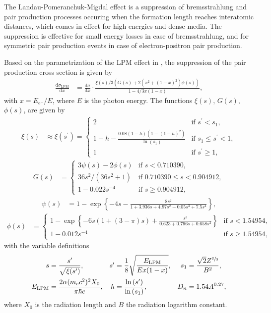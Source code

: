 The Landau-Pomeranchuk-Migdal effect is a suppression of bremsstrahlung and pair production processes occuring when the formation length reaches interatomic distances, which comes in effect for high energies and dense media.
The suppression is effective for small energy losses in case of bremsstrahlung, and for symmetric pair production events in case of electron-positron pair production.

Based on the parametrization of the LPM effect in \cite{RevModPhys.71.1501}, the suppression of the pair production cross section is given by
%
\begin{align}
	\label{eqn:lpm_photopair}
	\frac{\mathrm{d}\sigma_\text{LPM}}{\mathrm{d}x} &= \frac{\mathrm{d}\sigma}{\mathrm{d}x} \cdot \frac{\xi(s) / 3 \left(G(s) + 2 \left( x^2 + (1 - x)^2 \right) \phi(s) \right)}{1 - 4 / 3 x (1 - x)},
\end{align}
%
with $x = E_{e^{-}} / E$, where $E$ is the photon energy.
The functions $\xi(s)$, $G(s)$, $\phi(s)$, are given by \cite{PhysRevD.25.1291, PhysRev.103.1811}
%
\begin{align}
	\xi(s) &\approx \xi(s^\prime) =
	\begin{cases}
		2 & \text{if $s^\prime < s_1$}, \\
		1 + h - \frac{0.08 (1 - h) (1 - (1-h)^2)}{\ln{(s_1)}} & \text{if $s_1 \leq s^\prime < 1$}, \\
		1 & \text{if $s^\prime \geq 1$},
	\end{cases}
\end{align}
%
\begin{align}
	G(s) &=
	\begin{cases}
		3\psi(s) - 2\phi(s) & \text{if $s < \num{0.710390}$}, \\
		36s^2 / \left(36s^2 + 1 \right) & \text{if $\num{0.710390} \leq s < \num{0.904912}$}, \\
		1 - 0.022s^{-4} & \text{if $s \geq \num{0.904912}$},
	\end{cases}
\end{align}
%
\begin{align}
	\psi(s) &= 1 - \exp{\left\{ -4s - \frac{8s^2}{1 + 3.936s + 4.97s^2 - 0.05s^3 + 7.5 s^4} \right\}},
\end{align}
%
\begin{align}
	\phi(s) &=
	\begin{cases}
		1 - \exp{\left\{ -6s \left(1 + (3 - \pi) s\right) + \frac{s^3}{ 0.623 + 0.796s + 0.658 s^2} \right\}} & \text{if $s < \num{1.54954}$}, \\
		1 - 0.012 s^{-4} & \text{if $s \geq \num{1.54954}$},
	\end{cases}
\end{align}
%
with the variable definitions
%
\begin{align}
	s &= \frac{s^\prime}{\sqrt{\xi(s^\prime)}}, & s^\prime &= \frac{1}{8} \sqrt{\frac{E_\text{LPM}}{E x ( 1 - x)}}, & s_1 &= \frac{\sqrt{2} Z^{\sfrac{2}{3}}}{B^2}, \\ E_\text{LPM} &= \frac{2 \alpha (m_e c^2)^2 X_0}{\pi \hbar c}, & h &= \frac{\ln{(s^\prime)}}{\ln{(s_1)}}, & D_n &= 1.54 A^{0.27},
\end{align}
%
where $X_0$ is the radiation length and $B$ the radiation logarithm constant.

